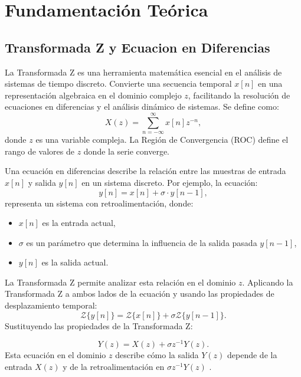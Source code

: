 \documentclass[conference]{IEEEtran}
\begin{document}
%







\section{Fundamentación Teórica }
\subsection{Transformada Z y Ecuacion en Diferencias}
La Transformada Z es una herramienta matemática esencial en el análisis de sistemas de tiempo discreto. Convierte una secuencia temporal \( x[n] \) en una representación algebraica en el dominio complejo \( z \), facilitando la resolución de ecuaciones en diferencias y el análisis dinámico de sistemas. Se define como:
\begin{equation}
    X(z) = \sum_{n=-\infty}^\infty x[n] z^{-n},
\end{equation}
donde \( z \) es una variable compleja. La Región de Convergencia (ROC) define el rango de valores de \( z \) donde la serie converge.

Una ecuación en diferencias describe la relación entre las muestras de entrada \( x[n] \) y salida \( y[n] \) en un sistema discreto. Por ejemplo, la ecuación:
\begin{equation}
    y[n] = x[n] + \sigma \cdot y[n-1],
\end{equation}
representa un sistema con retroalimentación, donde:
\begin{itemize}
    \item \( x[n] \) es la entrada actual,
    \item \( \sigma \) es un parámetro que determina la influencia de la salida pasada \( y[n-1] \),
    \item \( y[n] \) es la salida actual.
\end{itemize}

La Transformada Z permite analizar esta relación en el dominio \( z \). Aplicando la Transformada Z a ambos lados de la ecuación y usando las propiedades de desplazamiento temporal:
\begin{equation}
    \mathcal{Z}\{y[n]\} = \mathcal{Z}\{x[n]\} + \sigma \mathcal{Z}\{y[n-1]\}.
\end{equation}
Sustituyendo las propiedades de la Transformada Z:

\begin{equation}
    Y(z) = X(z) + \sigma z^{-1} Y(z).
\end{equation}
Esta ecuación en el dominio \( z \) describe cómo la salida \( Y(z) \) depende de la entrada \( X(z) \) y de la retroalimentación en \( \sigma z^{-1} Y(z) \) \cite{proakis2007tratamiento}.
\end{document}
